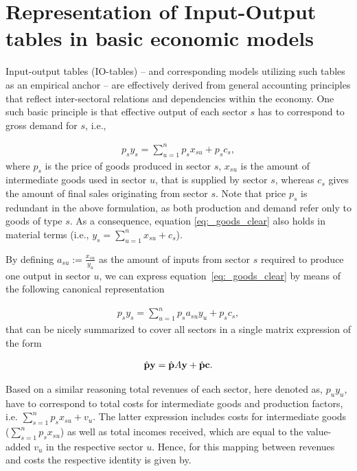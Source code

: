 
\section{Representation of Input-Output tables in basic economic models} \label{sec:IO_models}

Input-output tables (IO-tables) -- and corresponding models utilizing such tables as an empirical anchor -- are effectively derived from general accounting principles that reflect inter-sectoral relations and dependencies within the economy. One such basic principle is that effective output of each sector $s$ has to correspond to gross demand for $s$, i.e.,

\begin{align}
  \label{eq:_goods_clear}
  p_sy_s = \sum_{u = 1}^n p_s x_{su} + p_s c_s,
\end{align}
where $p_s$ is the price of goods produced in sector $s$, $x_{su}$ is the amount of intermediate goods used in sector $u$, that is supplied by sector $s$, whereas $c_s$ gives the amount of final sales originating from sector $s$. Note that price $p_s$ is redundant in the above formulation, as both production and demand refer only to goods of type $s$. As a consequence, equation \eqref{eq:_goods_clear} also holds in material terms (i.e., $y_s = \sum_{u = 1}^n x_{su} + c_s$).

By defining $a_{su} := \frac{x_{su}}{y_u}$ as  the amount of inputs from sector $s$ required to produce one output in sector $u$, we can express equation~\eqref{eq:_goods_clear} by means of the following canonical representation

\begin{align}
  \label{eq:_goods_clear_a}
  p_s y_s = \sum_{u = 1}^n p_s a_{su} y_u + p_s c_s,
\end{align}
that can be nicely summarized to cover all sectors in a single matrix expression of the form

\begin{align}
  \label{eq:_goods_clear_a_matrix}
\hat {\mathbf p} \mathbf{y} = \hat {\mathbf p} A   \mathbf{y} + \hat {\mathbf p} \mathbf{c}.
\end{align}

Based on a similar reasoning total revenues of each sector, here denoted as, $p_u y_u$, have to correspond to total costs for intermediate goods and production factors, i.e. $\sum_{s=1}^n p_s x_{su} + v_u$. The latter expression includes costs for intermediate goods ($\sum_{s=1}^n p_s x_{su}$) as well as total incomes received, which are equal to the value-added $v_u$ in the respective sector $u$. Hence, for this mapping between revenues and costs the respective identity is given by.

